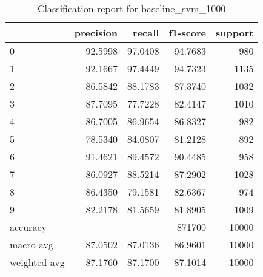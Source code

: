 \begin{table}[htb!]
\centering
\begin{tabular}{lrrrr}
    \toprule
    & precision & recall & f1-score & support \\
    \midrule
0 & 92.5998 & 97.0408 & 94.7683 & 980 \\
1 & 92.1667 & 97.4449 & 94.7323 & 1135 \\
2 & 86.5842 & 88.1783 & 87.3740 & 1032 \\
3 & 87.7095 & 77.7228 & 82.4147 & 1010 \\
4 & 86.7005 & 86.9654 & 86.8327 & 982 \\
5 & 78.5340 & 84.0807 & 81.2128 & 892 \\
6 & 91.4621 & 89.4572 & 90.4485 & 958 \\
7 & 86.0927 & 88.5214 & 87.2902 & 1028 \\
8 & 86.4350 & 79.1581 & 82.6367 & 974 \\
9 & 82.2178 & 81.5659 & 81.8905 & 1009 \\
accuracy & & & 871700 & 10000 \\
macro avg & 87.0502 & 87.0136 & 86.9601 & 10000 \\
weighted avg & 87.1760 & 87.1700 & 87.1014 & 10000 \\
\bottomrule
\end{tabular}
\caption{Classification report for baseline\_svm\_1000}
\label{tab:classification-report-baseline_svm_1000}
\end{table}
